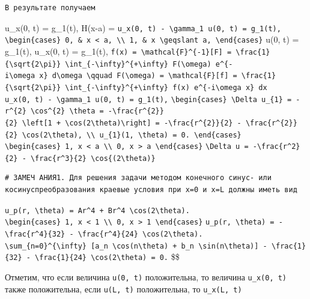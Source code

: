 \documentclass[
  ukrainian,
]{article}
\begin{document}
\begin{verbatim}
В результате получаем
\end{verbatim}

u\_x(0, t) = g\_1(t), H(x-a) =
\texttt{u\_x(0,\ t)\ -\ \textbackslash{}gamma\_1\ u(0,\ t)\ =\ g\_1(t),}
\texttt{\textbackslash{}begin\{cases\}\ 0,\ \&\ x\ \textless{}\ a,\ \textbackslash{}\textbackslash{}\ 1,\ \&\ x\ \textbackslash{}geqslant\ a,\ \textbackslash{}end\{cases\}}
u(0, t) = g\_1(t), u\_x(0, t) = g\_1(t),
\texttt{f(x)\ =\ \textbackslash{}mathcal\{F\}\^{}\{-1\}{[}F{]}\ =\ \textbackslash{}frac\{1\}\{\textbackslash{}sqrt\{2\textbackslash{}pi\}\}\ \textbackslash{}int\_\{-\textbackslash{}infty\}\^{}\{+\textbackslash{}infty\}\ F(\textbackslash{}omega)\ e\^{}\{-i\textbackslash{}omega\ x\}\ d\textbackslash{}omega\ \textbackslash{}qquad\ F(\textbackslash{}omega)\ =\ \textbackslash{}mathcal\{F\}{[}f{]}\ =\ \textbackslash{}frac\{1\}\{\textbackslash{}sqrt\{2\textbackslash{}pi\}\}\ \textbackslash{}int\_\{-\textbackslash{}infty\}\^{}\{+\textbackslash{}infty\}\ f(x)\ e\^{}\{-i\textbackslash{}omega\ x\}\ dx}
\texttt{u\_x(0,\ t)\ -\ \textbackslash{}gamma\_1\ u(0,\ t)\ =\ g\_1(t),}
\texttt{\textbackslash{}begin\{cases\}\ \textbackslash{}Delta\ u\_\{1\}\ =\ -r\^{}\{2\}\ \textbackslash{}cos\^{}\{2\}\ \textbackslash{}theta\ =\ -\textbackslash{}frac\{r\^{}\{2\}\}\{2\}\ \textbackslash{}left{[}1\ +\ \textbackslash{}cos(2\textbackslash{}theta)\textbackslash{}right{]}\ =\ -\textbackslash{}frac\{r\^{}\{2\}\}\{2\}\ -\ \textbackslash{}frac\{r\^{}\{2\}\}\{2\}\ \textbackslash{}cos(2\textbackslash{}theta),\ \textbackslash{}\textbackslash{}\ u\_\{1\}(1,\ \textbackslash{}theta)\ =\ 0.\ \textbackslash{}end\{cases\}}
\texttt{\textbackslash{}begin\{cases\}\ 1,\ \textbar{}x\textbar{}\ \textless{}\ a\ \textbackslash{}\textbackslash{}\ 0,\ \textbar{}x\textbar{}\ \textgreater{}\ a\ \textbackslash{}end\{cases\}}
\texttt{\textbackslash{}Delta\ u\ =\ -\textbackslash{}frac\{r\^{}2\}\{2\}\ -\ \textbackslash{}frac\{r\^{}3\}\{2\}\ \textbackslash{}cos\{(2\textbackslash{}theta)\}}

\begin{verbatim}
# ЗАМЕЧ АНИЯ1. Для решения задачи методом конечного синус- или косинуспреобразования краевые условия при x=0 и x=L должны иметь вид
\end{verbatim}

\texttt{u\_p(r,\ \textbackslash{}theta)\ =\ Ar\^{}4\ +\ Br\^{}4\ \textbackslash{}cos(2\textbackslash{}theta).}
\texttt{\textbackslash{}begin\{cases\}\ 1,\ \textbar{}x\textbar{}\ \textless{}\ 1\ \textbackslash{}\textbackslash{}\ 0,\ \textbar{}x\textbar{}\ \textgreater{}\ 1\ \textbackslash{}end\{cases\}}
\texttt{u\_p(r,\ \textbackslash{}theta)\ =\ -\textbackslash{}frac\{r\^{}4\}\{32\}\ -\ \textbackslash{}frac\{r\^{}4\}\{24\}\ \textbackslash{}cos(2\textbackslash{}theta).}
\texttt{\textbackslash{}sum\_\{n=0\}\^{}\{\textbackslash{}infty\}\ {[}a\_n\ \textbackslash{}cos(n\textbackslash{}theta)\ +\ b\_n\ \textbackslash{}sin(n\textbackslash{}theta){]}\ -\ \textbackslash{}frac\{1\}\{32\}\ -\ \textbackslash{}frac\{1\}\{24\}\ \textbackslash{}cos(2\textbackslash{}theta)\ =\ 0.}
\$\$

Отметим, что если величина \texttt{u(0,\ t)} положительна, то величина
\texttt{u\_x(0,\ t)} также положительна, если \texttt{u(L,\ t)}
положительна, то \texttt{u\_x(L,\ t)}
\end{document}
